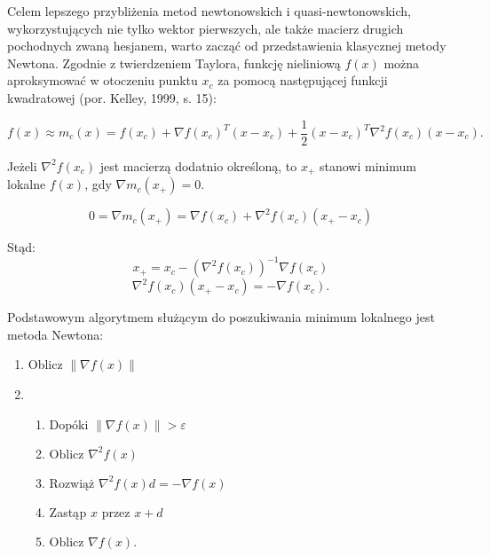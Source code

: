 Celem lepszego przybliżenia metod newtonowskich i quasi-newtonowskich, wykorzystujących nie tylko wektor pierwszych, ale także macierz drugich pochodnych zwaną hesjanem, warto zacząć od przedstawienia klasycznej metody Newtona. Zgodnie z twierdzeniem Taylora, funkcję nieliniową $f(x)$ można aproksymować w otoczeniu punktu $x_{c}$ za pomocą następującej funkcji kwadratowej (por. Kelley, 1999, s. 15)\nocite{Keley_1999}:

\begin{equation}
f(x) \approx m_{c}(x) = f(x_{c}) + \nabla f(x_{c})^{T} (x-x_{c}) + \frac{1}{2}(x-x_{c})^{T} \nabla^{2} f(x_{c}) (x-x_{c}).  \nonumber
\end{equation} 

Jeżeli $\nabla^{2} f(x_{c})$ jest macierzą dodatnio określoną, to $x_{+}$ stanowi minimum lokalne $f(x)$, gdy $\nabla m_{c} (x_{+}) = 0$.

\begin{equation}
0 = \nabla m_{c} (x_{+})  = \nabla f(x_{c}) + \nabla^{2} f(x_{c}) (x_{+} - x_{c}) \nonumber
\end{equation}

Stąd: 
\begin{equation}
x_{+} = x_{c} - (\nabla^{2} f(x_{c}))^{-1} \nabla f(x_{c})  \nonumber
\end{equation}
\begin{equation}
\nabla^{2} f(x_{c}) (x_{+} - x_{c}) = -\nabla f(x_{c}).  \nonumber
\end{equation}

Podstawowym algorytmem służącym do poszukiwania minimum lokalnego jest metoda Newtona:

\begin{enumerate}
\item Oblicz $\left\| \nabla f(x) \right\|$

\item
\begin{enumerate}
\item $\mbox{Dopóki } \left\| \nabla f(x) \right\| > \varepsilon$
\item $\mbox{Oblicz } \nabla^{2} f(x)$
\item $\mbox{Rozwiąż } \nabla^{2} f(x) d  = - \nabla f(x)$
\item Zastąp $x$ przez $x + d$
\item $\mbox{Oblicz } \nabla f(x)$.
\end{enumerate}

\end{enumerate}


